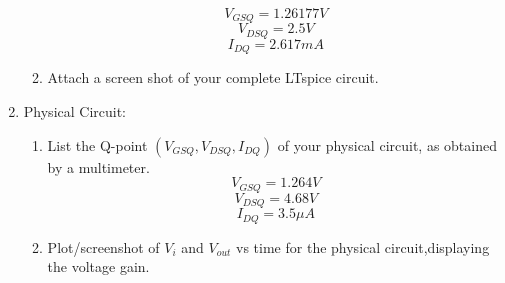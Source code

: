 \documentclass{article}
\begin{document}
\begin{enumerate}
\begin{enumerate}
    \begin{equation}
        V_{GSQ} = 1.26177V
    \end{equation}
    \begin{equation}
        V_{DSQ} = 2.5V
    \end{equation}
    \begin{equation}
        I_{DQ} = 2.617mA
    \end{equation}
    \item Attach a screen shot of your complete LTspice circuit.
    \begin{center}
    \end{center}
\end{enumerate}
\newpage
\item Physical Circuit:
\begin{enumerate}
    \item List the Q-point $(V_{GSQ}, V_{DSQ}, I_{DQ})$ of your physical circuit, as obtained by a multimeter.
    \begin{equation}
        V_{GSQ} = 1.264V
    \end{equation}
    \begin{equation}
        V_{DSQ} = 4.68V
    \end{equation}
    \begin{equation}
        I_{DQ} = 3.5\mu A
    \end{equation}
    \item Plot/screenshot of $V_i$ and $V_{out}$ vs time for the physical circuit,displaying the voltage gain.
    \begin{center}

\end{center}
\end{enumerate}
\end{enumerate}
\end{document}
